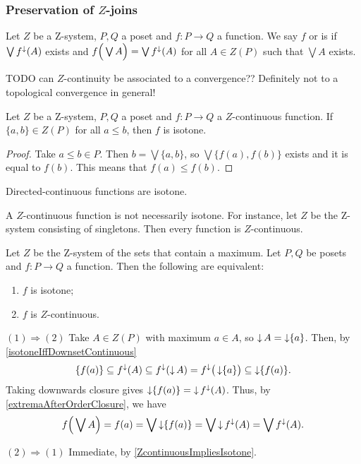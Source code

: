 \subsubsection{Preservation of $Z$-joins}
\begin{definition}
Let $Z$ be a $\mathrm{Z}$-system, $P,Q$ a poset and $f: P\to Q$ a function. We say $f$  or is  if $\bigvee f^\downarrow(A)$ exists and $f\Big(\bigvee A\Big) = \bigvee f^\downarrow (A)$ for all $A\in Z(P)$ such that $\bigvee A$ exists.
\end{definition}
TODO can $Z$-continuity be associated to a convergence?? Definitely not to a topological convergence in general!

\begin{lemma} \label{ZcontinuousImpliesIsotone}
Let $Z$ be a $\mathrm{Z}$-system, $P,Q$ a poset and $f: P\to Q$ a $Z$-continuous function. If $\{a,b\}\in Z(P)$ for all $a\leq b$, then $f$ is isotone.
\end{lemma}
\begin{proof}
Take $a\leq b\in P$. Then $b = \bigvee \{a,b\}$, so $\bigvee\big\{f(a), f(b)\big\}$ exists and it is equal to $f(b)$. This means that $f(a) \leq f(b)$.
\end{proof}
\begin{corollary}
Directed-continuous functions are isotone.
\end{corollary}

\begin{example}
A $Z$-continuous function is not necessarily isotone. For instance, let $Z$ be the $\mathrm{Z}$-system consisting of singletons. Then every function is $Z$-continuous.
\end{example}

\begin{lemma}
Let $Z$ be the $\mathrm{Z}$-system of the sets that contain a maximum. Let $P, Q$ be posets and $f: P\to Q$ a function. Then the following are equivalent:
\begin{enumerate}
\item $f$ is isotone;
\item $f$ is $Z$-continuous.
\end{enumerate}
$(1) \Rightarrow (2)$ Take $A\in Z(P)$ with maximum $a\in A$, so $\operatorname{\downarrow} A = \operatorname{\downarrow} \{a\}$. Then, by \ref{isotoneIffDownsetContinuous}
\[ \{f(a)\} \subseteq f^\downarrow(A) \subseteq f^\downarrow(\operatorname{\downarrow} A) = f^\downarrow\big(\operatorname{\downarrow} \{a\}\big) \subseteq \operatorname{\downarrow} \{f(a)\}. \]
Taking downwards closure gives $\operatorname{\downarrow}\{f(a)\} = \operatorname{\downarrow} f^\downarrow(A)$. Thus, by \ref{extremaAfterOrderClosure}, we have
\[ f\Big(\bigvee A\Big) = f(a) = \bigvee \operatorname{\downarrow}\{f(a)\} = \bigvee \operatorname{\downarrow} f^\downarrow(A) = \bigvee f^\downarrow(A). \]

$(2) \Rightarrow (1)$ Immediate, by \ref{ZcontinuousImpliesIsotone}.
\end{lemma}

